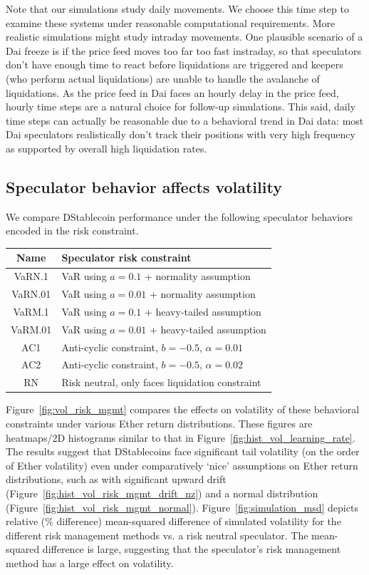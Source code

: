 Note that our simulations study daily movements. We choose this time step to examine these systems under reasonable computational requirements. More realistic simulations might study intraday movements. One plausible scenario of a Dai freeze is if the price feed moves too far too fast instraday, so that speculators don't have enough time to react before liquidations are triggered and keepers (who perform actual liquidations) are unable to handle the avalanche of liquidations. As the price feed in Dai faces an hourly delay in the price feed, hourly time steps are a natural choice for follow-up simulations. This said, daily time steps can actually be reasonable due to a behavioral trend in Dai data: most Dai speculators realistically don't track their positions with very high frequency as supported by overall high liquidation rates.





\subsection{Speculator behavior affects volatility}
We compare DStablecoin performance under the following speculator behaviors encoded in the risk constraint.
\begin{center}
	\begin{tabular}{c|l}
		\textbf{Name}	&	\textbf{Speculator risk constraint} \\
		\hline
		VaRN.1	&	 VaR using $a=0.1$ + normality assumption \\
		VaRN.01	&	VaR using $a=0.01$ + normality assumption \\
		VaRM.1	&	VaR using $a=0.1$ + heavy-tailed assumption \\
		VaRM.01	&	VaR using $a=0.01$ + heavy-tailed assumption \\
		AC1		&	Anti-cyclic constraint, $b=-0.5$, $\alpha=0.01$ \\
		AC2		&	Anti-cyclic constraint, $b=-0.5$, $\alpha=0.02$ \\
		RN		&	Risk neutral, only faces liquidation constraint
	\end{tabular}
\end{center}

Figure~\ref{fig:vol_risk_mgmt} compares the effects on volatility of these behavioral constraints under various Ether return distributions. These figures are heatmaps/2D histograms similar to that in Figure~\ref{fig:hist_vol_learning_rate}. The results suggest that DStablecoins face significant tail volatility (on the order of Ether volatility) even under comparatively `nice' assumptions on Ether return distributions, such as with significant upward drift (Figure~\ref{fig:hist_vol_risk_mgmt_drift_nz}) and a normal distribution (Figure~\ref{fig:hist_vol_risk_mgmt_normal}). Figure~\ref{fig:simulation_msd} depicts relative (\% difference) mean-squared difference of simulated volatility for the different risk management methods vs. a risk neutral speculator. The mean-squared difference is large, suggesting that the speculator's risk management method has a large effect on volatility.

